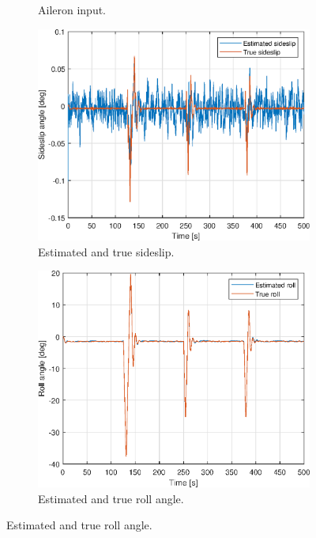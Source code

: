 \begin{figure}[ht]
\begin{subfigure}[b]{0.45\textwidth}
		\caption{Aileron input. }
		\label{fig:3f_delta_a_aileron}
	\end{subfigure}
	\begin{subfigure}[b]{0.45\textwidth}
		\includegraphics[width=\textwidth]{figures/3f/beta_sideslip.eps}
		\caption{Estimated and true sideslip. }
		\label{fig:3f_beta_sideslip}
	\end{subfigure}
	\begin{subfigure}[b]{0.45\textwidth}
		\includegraphics[width=\textwidth]{figures/3f/roll_phi.eps}
		\caption{Estimated and true roll angle. }
		\label{fig:3f_roll_angle}
    \end{subfigure}	

\end{figure}
